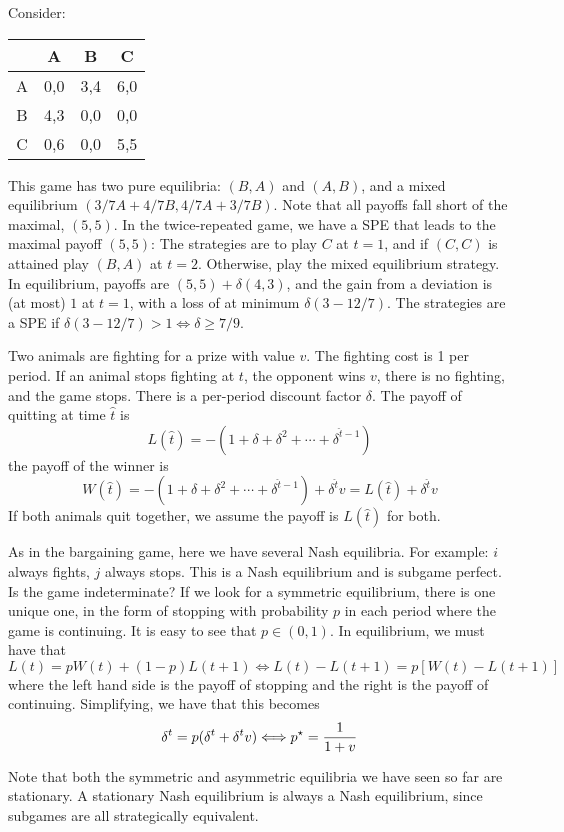 \documentclass[10pt]{article}
\begin{document}
\begin{example}
	 Consider: 
	\begin{center}
		\begin{tabular}{c|ccc}
			& A & B & C \\\hline
			A & 0,0 & 3,4 & 6,0 \\
			B & 4,3 & 0,0 & 0,0 \\
			C & 0,6 & 0,0 & 5,5
		\end{tabular}
	\end{center}
	This game has two pure equilibria: $(B,A)$ and $(A,B)$, and a mixed equilibrium $(3/7 A + 4/7 B, 4/7 A + 3/7 B)$. Note that all payoffs fall short of the maximal, $(5,5)$. In the twice-repeated game, we have a SPE that leads to the maximal payoff $(5,5)$: The strategies are to play $C$ at $t=1$, and if $(C,C)$ is attained play $(B,A)$ at $t=2$. Otherwise, play the mixed equilibrium strategy. In equilibrium, payoffs are $(5,5) + \delta(4,3)$, and the gain from a deviation is (at most) $1$ at $t=1$, with a loss of at minimum $\delta(3 - 12/7)$. The strategies are a SPE if $\delta(3-12/7) > 1 \Longleftrightarrow \delta \ge 7/9$.
\end{example}

\begin{example}
	 Two animals are fighting for a prize with value $v$. The fighting cost is 1 per period. If an animal stops fighting at $t$, the opponent wins $v$, there is no fighting, and the game stops. There is a per-period discount factor $\delta$. The payoff of quitting at time $\hat{t}$ is\[L(\hat{t}) = - (1 + \delta + \delta^2 + \cdots + \delta^{\hat{t}-1})\]the payoff of the winner is \[W(\hat{t}) = - (1 + \delta + \delta^2 + \cdots + \delta^{\hat{t}-1}) + \delta^{\hat{t}}v = L(\hat{t}) + \delta^{\hat{t}}v\]If both animals quit together, we assume the payoff is $L(\hat{t})$ for both. 
	
	As in the bargaining game, here we have several Nash equilibria. For example: $i$ always fights, $j$ always stops. This is a Nash equilibrium and is subgame perfect. Is the game indeterminate? If we look for a symmetric equilibrium, there is one unique one, in the form of stopping with probability $p$ in each period where the game is continuing. It is easy to see that $p \in (0,1)$. In equilibrium, we must have that\[L(t) = pW(t) + (1-p)L(t+1) \Longleftrightarrow L(t) - L(t+1) = p[W(t) - L(t+1)]\]where the left hand side is the payoff of stopping and the right is the payoff of continuing. Simplifying, we have that this becomes \[\delta^t = p(\delta^t + \delta^tv) \Longleftrightarrow p^\star = \frac{1}{1+v}\]
\end{example}
\begin{remark}
	Note that both the symmetric and asymmetric equilibria we have seen so far are stationary. A stationary Nash equilibrium is always a Nash equilibrium, since subgames are all strategically equivalent.
\end{remark}
\end{document}
